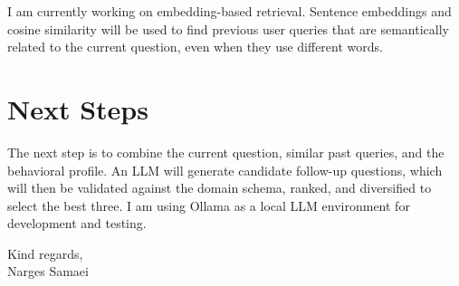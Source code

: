 \documentclass[a4paper,11pt]{report}
\begin{document}
I am currently working on embedding-based retrieval. Sentence embeddings and cosine similarity
will be used to find previous user queries that are semantically related to the current
question, even when they use different words.

\section{Next Steps}

The next step is to combine the current question, similar past queries, and the behavioral
profile. An LLM will generate candidate follow-up questions, which will then be validated against
the domain schema, ranked, and diversified to select the best three. I am using Ollama as a local
LLM environment for development and testing.

\vspace{0.8cm}

\noindent Kind regards,\\
Narges Samaei
\end{document}
